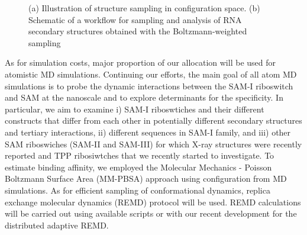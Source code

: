 \documentclass[a4paper,10pt]{article}
\newcommand{\up}{\vspace*{-1em}}
\begin{document}
\begin{figure}
\begin{center}
\end{center}
\up\up
\caption{(a) Illustration of structure sampling in configuration space.  (b) Schematic of a workflow for sampling and analysis of RNA secondary structures obtained with the Boltzmann-weighted sampling}
\label{fig:folding energy landscape}
\end{figure}

As for simulation costs, major proportion of our allocation will be used for atomistic MD simulations.  Continuing our efforts, the main goal of all atom MD simulations is to probe the dynamic interactions between the SAM-I riboswitch and SAM at the nanoscale and to explore determinants for the specificity. In particular, we aim to examine i) SAM-I riboswtiches and their different constructs that differ from each other in potentially different secondary structures and tertiary interactions, ii) different sequences in SAM-I family, and iii) other SAM riboswiches (SAM-II and SAM-III) for which X-ray structures were recently reported and TPP ribosiwtches that we recently started to investigate.  To estimate binding affinity, we employed the Molecular Mechanics - Poisson Boltzmann Surface Area (MM-PBSA) approach using configuration from MD simulations.  As for efficient sampling of conformational dynamics, replica exchange molecular dynamics (REMD) protocol will be used.  REMD calculations will be carried out using available scripts or with our recent development for the distributed adaptive REMD.  
\end{document}
